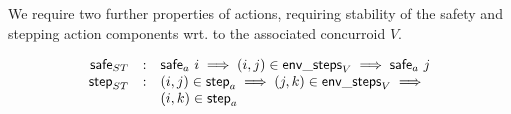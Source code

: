 We require two further properties of actions, requiring stability of
the safety and stepping action components wrt. to the associated
concurroid $V$.

\[
\begin{array}{rcl}
\mathsf{safe}_{ST} & : & \mathsf{safe}_a\ i \implies (i, j) \in \mathsf{env\_steps}_V \implies \mathsf{safe}_a\ j\\
\mathsf{step}_{ST} & : & (i, j) \in \mathsf{step}_a \implies (j, k) \in \mathsf{env\_steps}_V \implies \hbox{}\\
                  &   & (i, k) \in \mathsf{step}_a
\end{array}
\]




